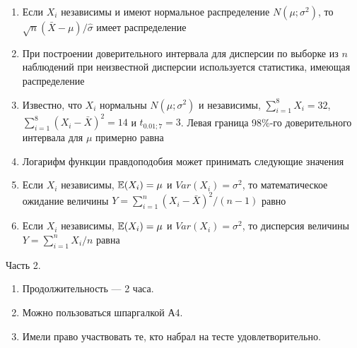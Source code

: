 \documentclass[pdftex,12pt,a4paper]{article}
\begin{document}
\begin{enumerate}

\item Если $X_i$ независимы и имеют нормальное распределение $N(\mu;\sigma^2)$, то $\sqrt{n}(\bar{X}-\mu)/\hat{\sigma}$ имеет распределение


\item При построении доверительного интервала для дисперсии по выборке из $n$ наблюдений при неизвестной дисперсии используется статистика, имеющая распределение


\item Известно, что $X_i$ нормальны $N(\mu;\sigma^2)$ и независимы, $\sum_{i=1}^8 X_i=32$, $\sum_{i=1}^8 (X_i-\bar{X})^2=14$ и $t_{0.01;7}=3$. Левая граница 98\%-го доверительного интервала для $\mu$ примерно равна



\item Логарифм функции правдоподобия может принимать следующие значения

\otvet{$[0;1]$}{$(-\infty;0]$}{$(-\infty;+\infty)$}{$[0;+\infty)$}{$[-1;1]$}

\item Если $X_i$ независимы, $\mathbb{E}(X_i)=\mu$ и $Var(X_i)=\sigma^2$, то математическое ожидание величины $Y=\sum_{i=1}^{n}(X_i-\bar{X})^2/(n-1)$ равно


\item Если $X_i$ независимы, $\mathbb{E}(X_i)=\mu$ и $Var(X_i)=\sigma^2$, то дисперсия величины $Y=\sum_{i=1}^{n}X_i/n$ равна



\end{enumerate}


Часть 2. 
\begin{enumerate}
\item Продолжительность --- 2 часа.
\item Можно пользоваться шпаргалкой А4.
\item Имели право участвовать те, кто набрал на тесте удовлетворительно.
\end{enumerate}
\end{document}
